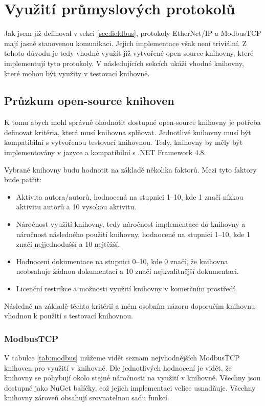 \clearpage

\section{Využití průmyslových protokolů}
Jak jsem již definoval v sekci \ref{sec:fieldbus}, protokoly EtherNet/IP a ModbusTCP mají jasně stanovenou komunikaci. Jejich implementace však není triviální. Z tohoto důvodu je tedy vhodné využít již vytvořené open-source knihovny, které implementují tyto protokoly. V následujících sekcích ukáži vhodné knihovny, které mohou být využity v testovací knihovně.

\subsection{Průzkum open-source knihoven}
K tomu abych mohl správně ohodnotit dostupné open-source knihovny je potřeba definovat kritéria, která musí knihovna splňovat. Jednotlivé knihovny musí být kompatibilní s vytvořenou testovací knihovnou. Tedy, knihovny by měly být implementovány v jazyce \csharp{} a kompatibilní s .NET Framework 4.8. 

Vybrané knihovny budu hodnotit na základě několika faktorů. Mezi tyto faktory bude patřit:

\begin{itemize}
    \item Aktivita autora/autorů, hodnocená na stupnici 1--10, kde 1 značí nízkou aktivitu autorů a 10 vysokou aktivitu.
    \item Náročnost využití knihovny, tedy náročnost implementace do knihovny a náročnost následného použití knihovny, hodnocené na stupnici 1--10, kde 1 značí nejjednodušší a 10 nejtěžší.
    \item Hodnocení dokumentace na stupnici 0--10, kde 0 značí, že knihovna neobsahuje žádnou dokumentaci a 10 značí nejkvalitnější dokumentaci.
    \item Licenční restrikce a možnosti využití knihovny v komerčním prostředí.
\end{itemize}

Následně na základě těchto kritérií a mém osobním názoru doporučím knihovnu vhodnou k použití s testovací knihovnou. 

\subsubsection{ModbusTCP}

V tabulce \ref{tab:modbus} můžeme vidět seznam nejvhodnějších ModbusTCP knihoven pro využití v knihovně. Dle jednotlivých hodnocení je vidět, že knihovny se pohybují okolo stejné náročnosti na využití v knihovně. Všechny jsou dostupné jako NuGet balíčky, což jejich implementaci velice usnadňuje. Všechny knihovny zároveň obsahují srovnatelnou sadu funkcí.

